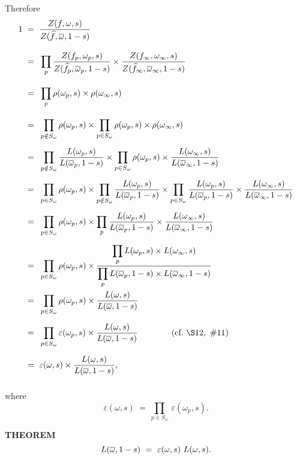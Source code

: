 Therefore
\allowdisplaybreaks
\begin{align*}
\allowdisplaybreaks
1 \ 
&=\vsx\ \frac{Z(f,\omega,s)}{Z(\widehat{f},\ov{\omega}, 1 - s)} \\
&=\vsx \ \prod_p 
\frac{Z(f_p,\omega_p,s)}{Z(\widehat{f}_p,\ov{\omega}_p, 1 - s)} \times 
\frac{Z(f_\infty,\omega_\infty,s)}{Z(\widehat{f}_\infty,\ov{\omega}_\infty, 1 - s)}\\
&=\vsx \ \prod_p \rho(\omega_p,s) \times \rho(\omega_\infty,s)\\
&=\vsx \ \prod_{p \notin S_\omega} \rho(\omega_p,s) \times 
\prod_{p \in S_\omega} \rho(\omega_p,s) \times \rho(\omega_\infty,s)\\
&=\vsx \ \prod_{p \notin S_\omega} \frac{L(\omega_p,s)}{L(\ov{\omega}_p,1-s)} \times 
\prod_{p \in S_\omega} \rho(\omega_p,s) \times \frac{L(\omega_\infty,s)}{L(\ov{\omega}_\infty,1-s)}\\
&=\vsx \ 
\prod_{p \in S_\omega} \rho(\omega_p,s) \times 
\prod_{p \notin S_\omega} \frac{L(\omega_p,s)}{L(\ov{\omega}_p,1-s)} \times
\prod_{p \in S_\omega} \frac{L(\omega_p,s)}{L(\ov{\omega}_p,1-s)} \times \frac{L(\omega_\infty,s)}{L(\ov{\omega}_\infty,1-s)}\\
&=\vsx \ \prod_{p \in S_\omega} \rho(\omega_p, s) \times 
\prod_p 
\frac{L(\omega_p,s)}{L(\ov{\omega}_p,1-s)} \times 
\frac{L(\omega_\infty,s)}{L(\ov{\omega}_\infty,1-s)}\\
&=\vsx \ \prod_{p \in S_\omega} \rho(\omega_p, s) \times 
\ds\frac
{\ds\prod\limits_p L(\omega_p,s) \times L(\omega_\infty,s)}
{\ds\prod\limits_p L(\ov{\omega}_p,1-s) \times L(\ov{\omega}_\infty,1-s)}\\
&=\vsx \ \prod_{p \in S_\omega} \rho(\omega_p, s) \times \frac{L(\omega,s)}{L(\ov{\omega},1-s)}\\
&=\vsx \ \prod_{p \in S_\omega} \varepsilon(\omega_p, s) \times \frac{L(\omega,s)}{L(\ov{\omega},1-s)}
\qquad\qquad (\text{cf.} \ \S12, \ \#11)\\
&=\vsx \ \varepsilon(\omega, s) \times \frac{L(\omega,s)}{L(\ov{\omega},1-s)},
\end{align*}
where 
\[
\varepsilon(\omega, s) \ = \ \prod\limits_{p \in S_\omega} \ \varepsilon(\omega_p, s).
\]
\vspace{0.1cm}


\begin{x}{\small\bf THEOREM} \ %
\[
L(\overline{\omega}, 1 - s) \ = \ \varepsilon(\omega, s) \ L(\omega,s).
\]
\end{x}
\vspace{0.1cm}


